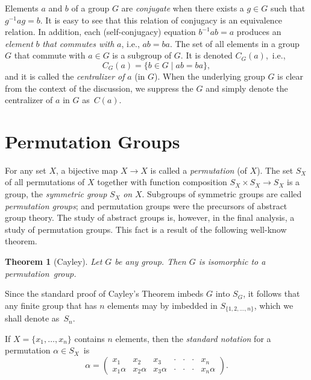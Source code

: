 \documentclass{surv-l}
\numberwithin{equation}{section}
\numberwithin{table}{section}
\numberwithin{figure}{section}
\newtheorem{theorem}[equation]{Theorem}
\theoremstyle{definition}
\begin{document}
Elements $a$ and $b$ of a group $G$ are \emph{conjugate} when there
exists a $g\in G$ such that $g^{-1}ag=b$. It is easy to see that
this relation of conjugacy is an equivalence relation. In
addition, each (self-conjugacy) equation $b^{-1}ab=a$ produces an
\emph{element} $b$ \emph{that commutes with} $a$, i.e., $ab=ba$.
The set of all elements in a group $G$ that commute with $a\in G$
is a subgroup of $G$. It is denoted $C_{G}(a)$,~i.e.,
\[
C_{G}(a) =\{b\in G\mid ab=ba\},
\]
and it is called the \emph{centralizer of} $a$ (in $G$). When the
underlying group $G$ is clear from the context of the discussion,
we suppress the $G$ and simply denote the centralizer of $a$ in $G$
as~$C(a)$.

\section{Permutation Groups}\label{secA.72}

For any set $X$, a bijective map $X\rightarrow X$ is called a
\emph{permutation} (of $X$). The set $S_{X}$ of all permutations
of $X$ together with function composition $S_{X}\times
S_{X}\rightarrow S_{X}$ is a group, the \emph{symmetric
group} $S_{X}$
\emph{on} $X$. Subgroups of symmetric groups are called
\emph{permutation groups}; and permutation groups were the
precursors of abstract group theory. The study of abstract groups
is, however, in the final analysis, a study of permutation groups.
This fact is a result of the following well-know theorem.

\begin{theorem}[Cayley]\label{thm12.72.1}
Let $G$ be any group. Then $G$ is isomorphic to a permutation~group.
\end{theorem}

Since the standard proof of Cayley's Theorem imbeds $G$ into $S_{G}$, it follows that any finite group
that has $n$ elements may by imbedded in $S_{\{1,2,\ldots,n\}}$,
which we shall denote as~$S_{n}$.

If $X=\{x_{1},\ldots, x_{n}\}$ contains $n$ elements, then the
\emph{standard notation} for a
permutation $\alpha\in S_{X}$~is
\[
\alpha=\left(\begin{matrix}
x_{1} & x_{2} & x_{3} &\cdot & \cdot &\cdot & x_{n}\\
x_{1}\alpha & x_{2}\alpha & x_{3}\alpha &\cdot&\cdot&\cdot & x_{n}\alpha
\end{matrix}\right)\!.
\]
\end{document}
